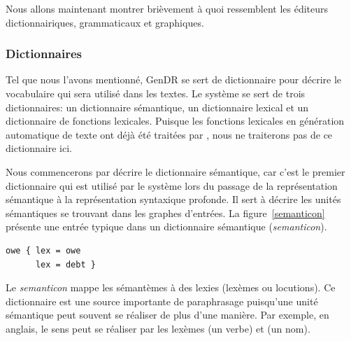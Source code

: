 Nous allons maintenant montrer brièvement à quoi ressemblent les éditeurs dictionnairiques, grammaticaux et graphiques.


\subsubsection{Dictionnaires}\label{dictio}

Tel que nous l'avons mentionné, GenDR se sert de dictionnaire pour décrire le vocabulaire qui sera utilisé dans les textes. Le système se sert de trois dictionnaires: un dictionnaire sémantique, un dictionnaire lexical et un dictionnaire de fonctions lexicales. Puisque les fonctions lexicales en génération automatique de texte ont déjà été traitées par \cite{LambreyImplementationcollocationspour2017}, nous ne traiterons pas de ce dictionnaire ici.

Nous commencerons par décrire le dictionnaire sémantique, car c'est le premier dictionnaire qui est utilisé par le système lors du passage de la représentation sémantique à la représentation syntaxique profonde. Il sert à décrire les unités sémantiques se trouvant dans les graphes d'entrées. La figure~\ref{semanticon} présente une entrée typique dans un dictionnaire sémantique (\emph{semanticon}).

\begin{lstlisting}[language=Xml, caption=Échantillon du \emph{semanticon}, label=semanticon]
owe { lex = owe
      lex = debt }
\end{lstlisting}

Le \emph{semanticon} mappe les sémantèmes à des lexies (lexèmes ou locutions). Ce dictionnaire est une source importante de paraphrasage puisqu'une unité sémantique peut souvent se réaliser de plus d'une manière. Par exemple, en anglais, le sens  peut se réaliser par les lexèmes  (un verbe) et  (un nom).


